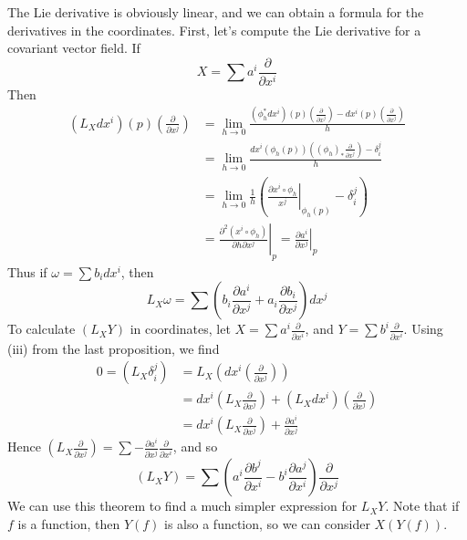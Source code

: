 The Lie derivative is obviously linear, and we can obtain a formula for the derivatives in the coordinates. First, let's compute the Lie derivative for a covariant vector field. If
%
\[ X = \sum a^i \frac{\partial}{\partial x^i} \]
%
Then
%
\begin{align*}
    (L_X dx^i)(p) \left( \frac{\partial}{\partial x^j} \right) &= \lim_{h \to 0} \frac{(\phi_h^* dx^i)(p) \left( \frac{\partial}{\partial x^j} \right) - dx^i(p) \left( \frac{\partial}{\partial x^j} \right)}{h}\\
    &= \lim_{h \to 0} \frac{dx^i(\phi_h(p)) \left((\phi_h)_* \frac{\partial}{\partial x^j} \right) - \delta_i^j}{h}\\
    &= \lim_{h \to 0} \frac{1}{h} \left( \left. \frac{\partial x^i \circ \phi_h}{x^j} \right|_{\phi_h(p)} - \delta_i^j \right)\\
    &= \left. \frac{\partial^2 (x^i \circ \phi_h)}{\partial h \partial x^j} \right|_p = \left. \frac{\partial a^i}{\partial x^j} \right|_p
\end{align*}
%
Thus if $\omega = \sum b_i dx^i$, then
%
\[ L_X \omega = \sum \left( b_i \frac{\partial a^i}{\partial x^j} + a_i \frac{\partial b_i}{\partial x^j} \right) dx^j \]
%
To calculate $(L_X Y)$ in coordinates, let $X = \sum a^i \frac{\partial}{\partial x^i}$, and $Y = \sum b^i \frac{\partial}{\partial x^i}$. Using (iii) from the last proposition, we find
%
\begin{align*}
    0 = (L_X \delta_i^j) &= L_X \left( dx^i \left(\frac{\partial}{\partial x^j} \right) \right)\\
    &= dx^i \left( L_X \frac{\partial}{\partial x^j} \right) + (L_X dx^i) \left( \frac{\partial}{\partial x^j} \right)\\
    &= dx^i \left( L_X \frac{\partial}{\partial x^j} \right) + \frac{\partial a^i}{\partial x^j}
\end{align*}
%
Hence $\left( L_X \frac{\partial}{\partial x^j} \right) = \sum - \frac{\partial a^i}{\partial x^j} \frac{\partial}{\partial x^i}$, and so
%
\[ (L_X Y) = \sum \left( a^i \frac{\partial b^j}{\partial x^i}  - b^i \frac{\partial a^j}{\partial x^i} \right) \frac{\partial}{\partial x^j} \]
%
We can use this theorem to find a much simpler expression for $L_X Y$. Note that if $f$ is a function, then $Y(f)$ is also a function, so we can consider $X(Y(f))$.


